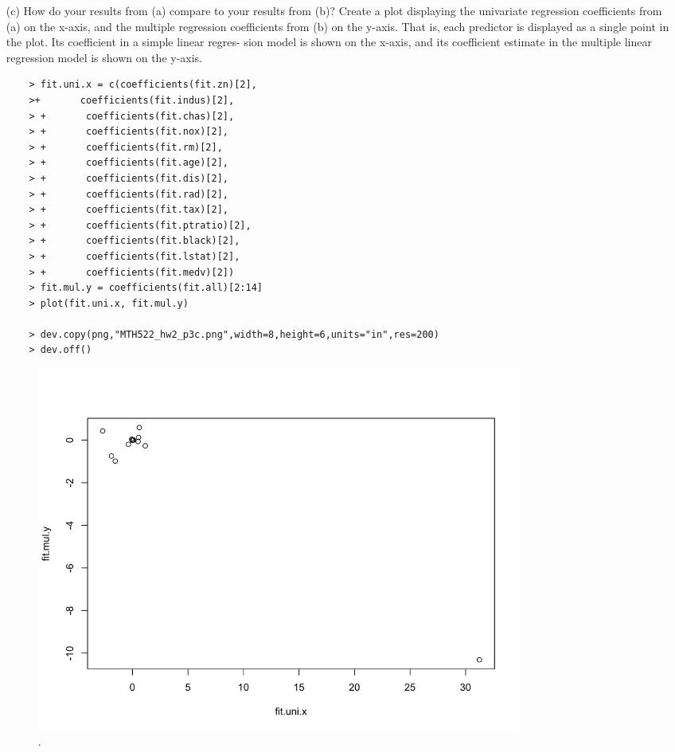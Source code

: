 \documentclass{article}
\begin{document}
\begin{itemize}
\item[(c)] How do your results from (a) compare to your results from (b)? Create a plot displaying the univariate regression coefficients from (a) on the x-axis, and the multiple regression coefficients from (b) on the y-axis. That is, each predictor is displayed as a single point in the plot. Its coefficient in a simple linear regres- sion model is shown on the x-axis, and its coefficient estimate in the multiple linear regression model is shown on the y-axis.

\begin{program}
	\begin{verbatim}
	> fit.uni.x = c(coefficients(fit.zn)[2],
	>+       coefficients(fit.indus)[2],
	> +       coefficients(fit.chas)[2],
	> +       coefficients(fit.nox)[2],
	> +       coefficients(fit.rm)[2],
	> +       coefficients(fit.age)[2],
	> +       coefficients(fit.dis)[2],
	> +       coefficients(fit.rad)[2],
	> +       coefficients(fit.tax)[2],
	> +       coefficients(fit.ptratio)[2],
	> +       coefficients(fit.black)[2],
	> +       coefficients(fit.lstat)[2],
	> +       coefficients(fit.medv)[2])
	> fit.mul.y = coefficients(fit.all)[2:14]
	> plot(fit.uni.x, fit.mul.y)
	
	> dev.copy(png,"MTH522_hw2_p3c.png",width=8,height=6,units="in",res=200)
	> dev.off()	
	\end{verbatim}
	\caption{The R code used to generate Figure.\ \ref{fig:MTH522_hw2_p3c}.}
\end{program}


\begin{figure}[htb]
	\begin{center}
		\includegraphics[width=0.8\textwidth]{MTH522_hw2_p3c.png}
	\end{center}
	\caption{.}
	\label{fig:MTH522_hw2_p3c}
\end{figure}



\end{itemize}
\end{document}
